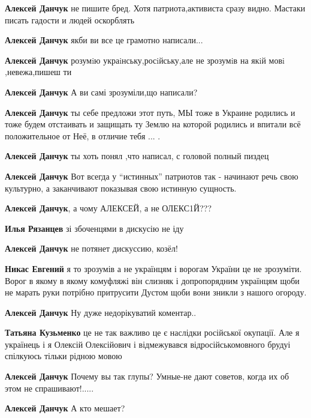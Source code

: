 \begin{itemize}
\begin{itemize}
\textbf{Алексей Данчук} не пишите бред. Хотя патриота,активиста сразу видно.
Мастаки писать гадости и людей оскорблять

\textbf{Алексей Данчук} якби ви все це грамотно написали...

\textbf{Алексей Данчук} розумiю украiнську,росiйську,але не зрозумiв на якiй мовi ,невежа,пишеш ти

\textbf{Алексей Данчук} А ви самі зрозуміли,що написали?

\textbf{Алексей Данчук} ты себе предложи этот путь, МЫ тоже в Украине родились и тоже будем отстаивать и защищать ту Землю на которой родились и впитали всё положительное от Неё, в отличие тебя ... .

\textbf{Алексей Данчук} ты хоть понял ,что написал, с головой полный пиздец


\textbf{Алексей Данчук} Вот всегда у \enquote{истинных} патриотов так - начинают речь
свою культурно, а заканчивают показывая свою истинную сущность.

\textbf{Алексей Данчук}, а чому АЛЕКСЕЙ, а не ОЛЕКС1Й???

\textbf{Илья Рязанцев} зі збоченцями в дискусію не іду

\textbf{Алексей Данчук} не потянет дискуссию, козёл!


\textbf{Никас Евгений} я то зрозумів а не українцям і ворогам України це не зрозуміти.
Ворог в якому в якому комуфляжі він слизняк і допропорядним українцям щоби не
марать руки потрібно притрусити Дустом щоби вони зникли з нашого огороду.

\textbf{Алексей Данчук} Ну дуже недорікуватий коментар..

\textbf{Татьяна Кузьменко} це не так важливо це є наслідки російської окупації.
Але я українець і я Олексій Олексійович і відмежувався відросійськомовного
брудуі спілкуюсь тільки рідною мовою

\textbf{Алексей Данчук} Почему вы так глупы? Умные-не дают советов, когда их об этом не спрашивают!.....

\textbf{Алексей Данчук} А кто мешает?


\end{itemize}
\end{itemize}
